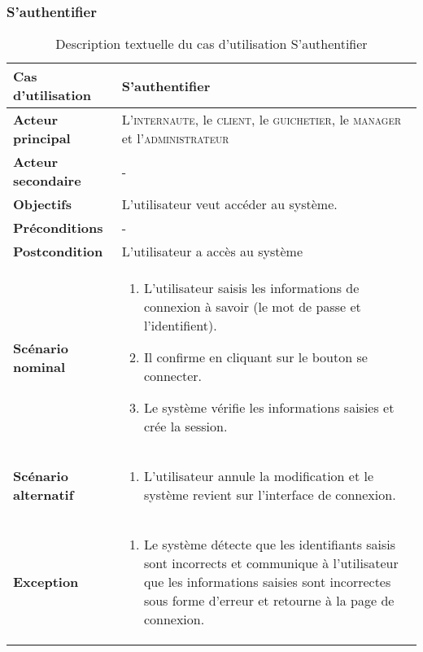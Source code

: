         \subsubsection[S’authentifier]{S’authentifier}
            \begin{longtable}{p{4cm} p{9cm}}
                \caption{Description textuelle du cas d’utilisation S’authentifier}
                \label{table:usecaseSauth}
                \\\hline\hline
                    \textbf{Cas d’utilisation} & \textbf{S’authentifier}
                \\\hline\hline
                        \textbf{Acteur principal} & L’\textsc{internaute}, le \textsc{client},
                        le \textsc{guichetier}, le \textsc{manager} et l’\textsc{administrateur}
                    \\
                        \textbf{Acteur secondaire} & -
                    \\
                        \textbf{Objectifs} & L’utilisateur veut accéder au système.
                    \\
                        \textbf{Préconditions} & -
                    \\
                    \textbf{Postcondition} & L’utilisateur a accès au système
                    \\
                    \textbf{Scénario nominal} &
                        \begin{enumerate}[leftmargin=*]
                            \item L’utilisateur saisis les informations de connexion à savoir (le mot de
                            passe et l’identifient).
                            \item Il confirme en cliquant sur le bouton se connecter.
                            \item Le système vérifie les informations saisies et crée la session.
                        \end{enumerate}
                    \\
                    \textbf{Scénario alternatif} &
                    \begin{enumerate}[leftmargin=*]
                            \item L’utilisateur annule la modification et le système revient sur l’interface de
                            connexion.
                        \end{enumerate}
                    \\
                    \textbf{Exception} &
                    \begin{enumerate}[leftmargin=*]
                            \item Le système détecte que les identifiants saisis sont incorrects et communique à
                            l’utilisateur que les informations saisies sont incorrectes sous forme d’erreur et
                            retourne à la page de connexion.
                        \end{enumerate}
                \\\bottomrule
            \end{longtable}

